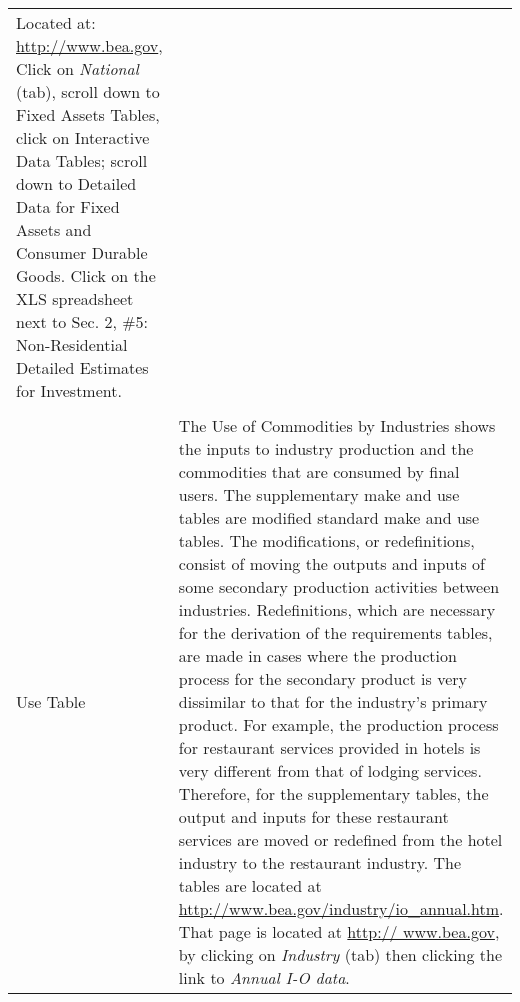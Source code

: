 \begin{table}
\begin{center}
\begin{tabular}{l @{\hspace{2em}} p{10cm}}
Located at: \url{http://www.bea.gov}, Click on \emph{National} (tab), scroll down to Fixed Assets Tables, click on Interactive Data Tables; scroll down to Detailed Data for Fixed Assets and Consumer Durable Goods. Click on the XLS spreadsheet next to Sec. 2, \#5: Non-Residential Detailed Estimates for Investment.\\
 & \\
Use Table & 
The Use of Commodities by Industries shows the inputs to industry production and the commodities that are consumed by final users. The supplementary make and use tables are modified standard make and use tables. The modifications, or redefinitions, consist of moving the outputs and inputs of some secondary production activities between industries. Redefinitions, which are necessary for the derivation of the requirements tables, are made in cases where the production process for the secondary product is very dissimilar to that for the industry’s primary product. For example, the production process for restaurant services provided in hotels is very different from that of lodging services. Therefore, for the supplementary tables, the output and inputs for these restaurant services are moved or redefined from the hotel industry to the restaurant industry. The tables are located at \url{http://www.bea.gov/industry/io\_annual.htm}. That page is located at \url{http:// www.bea.gov}, by clicking on \emph{ Industry} (tab) then clicking the link to\emph{ Annual I-O data}.\\
    \bottomrule
  \end{tabular}

\end{center}
\label{tab:data_definitions}
\end{table}

